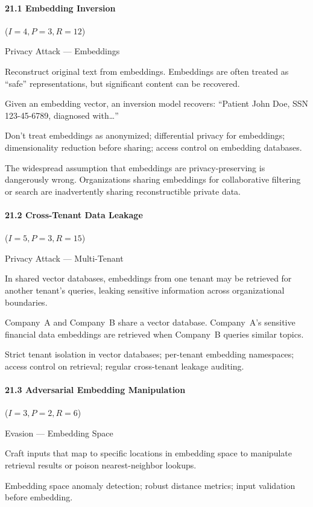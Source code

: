 \documentclass[conference]{IEEEtran}
\newenvironment{attackentry}{\begin{description}[style=unboxed,leftmargin=0cm,itemsep=1pt,parsep=1pt,topsep=2pt,font=\sffamily\small\color{accentdark}]}{\end{description}}
\begin{document}
\paragraph{21.1 Embedding Inversion} ($I{=}4, P{=}3, R{=}12$)
\begin{attackentry}
\item[Category:] Privacy Attack --- Embeddings
\item[How it works:] Reconstruct original text from embeddings. Embeddings are often treated as ``safe'' representations, but significant content can be recovered.
\item[Example:] Given an embedding vector, an inversion model recovers: ``Patient John Doe, SSN 123-45-6789, diagnosed with\ldots''
\item[Mitigations:] Don't treat embeddings as anonymized; differential privacy for embeddings; dimensionality reduction before sharing; access control on embedding databases.
\item[Novel Inference (Reported):] The widespread assumption that embeddings are privacy-preserving is dangerously wrong. Organizations sharing embeddings for collaborative filtering or search are inadvertently sharing reconstructible private data.
\end{attackentry}

\paragraph{21.2 Cross-Tenant Data Leakage} ($I{=}5, P{=}3, R{=}15$)
\begin{attackentry}
\item[Category:] Privacy Attack --- Multi-Tenant
\item[How it works:] In shared vector databases, embeddings from one tenant may be retrieved for another tenant's queries, leaking sensitive information across organizational boundaries.
\item[Example:] Company~A and Company~B share a vector database. Company~A's sensitive financial data embeddings are retrieved when Company~B queries similar topics.
\item[Mitigations:] Strict tenant isolation in vector databases; per-tenant embedding namespaces; access control on retrieval; regular cross-tenant leakage auditing.
\end{attackentry}

\paragraph{21.3 Adversarial Embedding Manipulation} ($I{=}3, P{=}2, R{=}6$)
\begin{attackentry}
\item[Category:] Evasion --- Embedding Space
\item[How it works:] Craft inputs that map to specific locations in embedding space to manipulate retrieval results or poison nearest-neighbor lookups.
\item[Mitigations:] Embedding space anomaly detection; robust distance metrics; input validation before embedding.
\end{attackentry}
\end{document}
